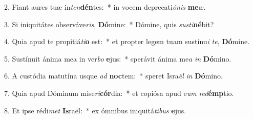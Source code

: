 2. Fiant aures tuæ in\textit{ten}\textbf{dén}tes:~*  in vocem deprecati\textit{ó}\textit{nis} \textbf{me}æ.\

3. Si iniquitátes observáve\textit{ris}, \textbf{Dó}mine:~*  Dómine, quis \textit{sus}\textit{ti}\textbf{né}bit?\

4. Quia apud te propitiá\textit{ti}\textbf{o} est:~*  et propter legem tuam sustínu\textit{i} \textit{te}, \textbf{Dó}mine.\

5. Sustínuit ánima mea in ver\textit{bo} \textbf{e}jus:~*  sperávit ánima me\textit{a} \textit{in} \textbf{Dó}mino.\

6. A custódia matutína usque \textit{ad} \textbf{noc}tem:~*  speret Isra\textit{ël} \textit{in} \textbf{Dó}mino.\

7. Quia apud Dóminum mise\textit{ri}\textbf{cór}dia:~*  et copiósa apud e\textit{um} \textit{red}\textbf{émp}tio.\

8. Et ipse rédi\textit{met} \textbf{Is}raël:~*  ex ómnibus iniquitá\textit{ti}\textit{bus} \textbf{e}jus.\

